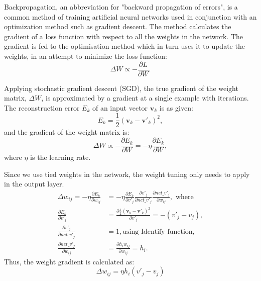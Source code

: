 Backpropagation, an abbreviation for "backward propagation of errors", is a common method of training artificial neural networks used in conjunction with an optimization method such as gradient descent.
The method calculates the gradient of a loss function with respect to all the weights in the network.
The gradient is fed to the optimisation method which in turn uses it to update the weights, in an attempt to minimize the loss function:
\begin{equation}
\Delta W \propto -\frac{\partial L}{\partial W}.
\end{equation}

Applying stochastic gradient descent (SGD), the true gradient of the weight matrix, $\Delta W$, is approximated by a gradient at a single example with iterations.
The reconstruction error $E_k$ of an input vector $\mathbf{v}_k$ is as given:
\begin{equation}
E_k = \frac{1}{2}(\mathbf{v}_k - \mathbf{v'}_k)^2,
\end{equation}
and the gradient of the weight matrix is:
\begin{equation}
\Delta W \propto -\frac{\partial E_k}{\partial W}=-\eta \frac{\partial E_k}{\partial W},
\end{equation}
where $\eta$ is the learning rate.

Since we use tied weights in the network, the weight tuning only needs to apply in the output layer.
\begin{equation}
\begin{aligned}
\Delta w_{ij} = -\eta \frac{\partial E_k}{\partial w_{ij}} &= -\eta \frac{\partial E_k}{\partial v'_j} \frac{\partial v'_j}{\partial net\_v'_j} \frac{\partial net\_v'_j}{\partial w_{ij}}, \textrm{ where} \\
\frac{\partial E_k}{\partial v'_j} &= \frac{\partial \frac{1}{2}(\mathbf{v}_k - \mathbf{v'}_k)^2}{\partial v'_j}= -(v'_j - v_j), \\
\frac{\partial v'_j}{\partial net\_v'_j} &= 1, \textrm{using Identify function,}\\
\frac{\partial net\_v'_j}{\partial w_{ij}} &= \frac{\partial h_i w_{ij}}{\partial w_{ij}} = h_i.
\end{aligned}
\end{equation}
Thus, the weight gradient is calculated as:
\begin{equation}
\Delta w_{ij} = \eta h_i(v'_j - v_j)
\end{equation}

